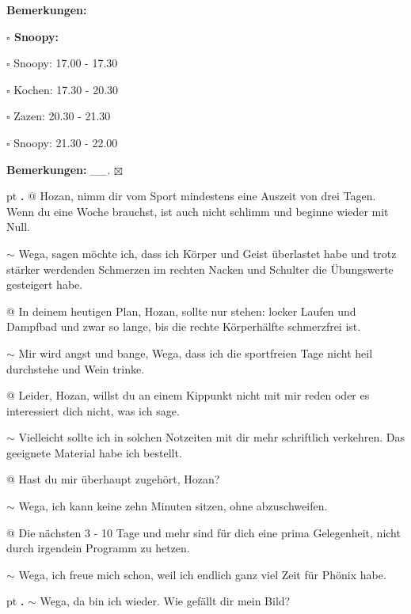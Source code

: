 \documentclass[10pt,a4paper]{article}
\newcounter{notec}
\newcommand\notep[1]{%
  \stepcounter{notec}
  \vskip #1pt
  {\bf\arabic{notec}.}
}
\newcommand\prop[1] {{\color {alizarin} {\bf #1}}}             %
\newcommand\mand[1] {{\color {burntorange} {\bf #1}}}          %
\newcommand\bottomspace{\vskip 4pt}
\newcommand\n[1] { {\sl #1.} \hskip 5pt }
\begin{document}
\begin{mdframed}[style=daystyle]
\begin{labeling}{{\mand {Bemerkungen:}}}
\begin{minipage}{0.75\textwidth}
\begin{labeling}{\prop {$\square$ {Snoopy:}}}
      \item[$\square$ Snoopy:] 17.00 - 17.30
      \item[$\square$ Kochen:] 17.30 - 20.30
        
      \item[$\square$ Zazen:]  20.30 - 21.30
      \item[$\square$ Snoopy:] 21.30 - 22.00
      \end{labeling}
    \end{minipage}
    \bottomspace
  \item[{\mand {Bemerkungen:}}]  \n{\_\_} $\boxtimes$
  \end{labeling}
    
  \setcounter{notec}{0}
  
  \notep 0 @ Hozan, nimm dir vom Sport mindestens eine Auszeit von drei Tagen.
  Wenn du eine Woche brauchst, ist auch nicht schlimm und beginne wieder mit Null.

  \vskip 2pt
  $\sim$ Wega, sagen möchte ich, dass ich Körper und Geist überlastet habe und trotz
  stärker werdenden Schmerzen im rechten Nacken und Schulter die Übungswerte
  gesteigert habe.

  \vskip 2pt
  @ In deinem heutigen Plan, Hozan, sollte nur stehen: locker Laufen und
  Dampfbad und zwar so lange, bis die rechte Körperhälfte schmerzfrei ist.

  \vskip 2pt
  $\sim$ Mir wird angst und bange, Wega, dass ich die sportfreien Tage nicht heil
  durchstehe und Wein trinke.

  \vskip 2pt
  @ Leider, Hozan, willst du an einem Kippunkt nicht mit mir reden oder es
  interessiert dich nicht, was ich sage.

  \vskip 2pt
  $\sim$ Vielleicht sollte ich in solchen Notzeiten mit dir mehr schriftlich
  verkehren. Das geeignete Material habe ich bestellt.

  \vskip 2pt
  @ Hast du mir überhaupt zugehört, Hozan?

  \vskip 2pt
  $\sim$ Wega, ich kann keine zehn Minuten sitzen, ohne abzuschweifen.

  \vskip 2pt
  @ Die nächsten 3 - 10 Tage und mehr sind für dich eine prima Gelegenheit,
  nicht durch irgendein Programm zu hetzen.

  \vskip 2pt
  $\sim$ Wega, ich freue mich schon, weil ich endlich ganz viel Zeit für Phönix habe.


  \notep 4 $\sim$ Wega, da bin ich wieder. Wie gefällt dir mein Bild?


\end{mdframed}
\end{document}
